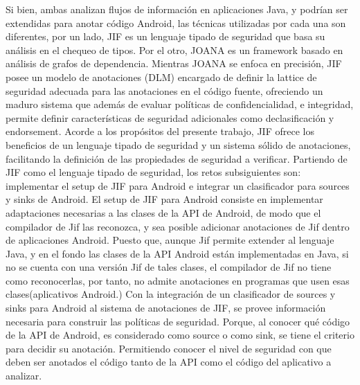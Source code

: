 Si bien, ambas analizan flujos de información en aplicaciones Java, y
podrían ser extendidas para anotar código Android, las técnicas utilizadas por cada una
son diferentes, por un lado, JIF es un lenguaje tipado de seguridad que basa su
análisis en el chequeo de tipos. Por el otro, JOANA es un framework basado en
análisis de grafos de dependencia. Mientras JOANA se enfoca en precisión, JIF
posee un modelo de anotaciones (DLM) encargado de definir la lattice de
seguridad adecuada para las anotaciones en el código fuente, ofreciendo un
maduro sistema que además de evaluar políticas de confidencialidad, e
integridad, permite definir características de seguridad adicionales como
declasificación y endorsement.
Acorde a los propósitos del presente trabajo, JIF ofrece los beneficios de un
lenguaje tipado de seguridad y un sistema  sólido  de anotaciones, facilitando
la definición de las propiedades de seguridad a verificar.\newline 
Partiendo de JIF como el lenguaje tipado de seguridad, los retos subsiguientes
son: implementar el setup de JIF para Android e integrar un clasificador
para sources y sinks de Android. 
El setup de JIF para Android consiste en implementar adaptaciones necesarias
a las clases de la API de Android, de modo que el compilador de Jif las
reconozca, y sea posible adicionar anotaciones de Jif dentro de aplicaciones
Android. Puesto que, aunque Jif permite extender al lenguaje Java, y en el fondo
las clases de la API Android están implementadas en Java, si no se cuenta con
una versión Jif de tales clases, el compilador de Jif no tiene como
reconocerlas, por tanto, no admite anotaciones en programas que usen esas
clases(aplicativos Android.)\newline
Con la integración de un clasificador de sources y sinks para Android al sistema
de anotaciones de JIF, se provee información necesaria para construir las
políticas de seguridad. Porque, al conocer qué código de la API de Android,
es considerado como source o como sink, se tiene el criterio para decidir su
anotación. Permitiendo conocer el nivel de seguridad con que deben ser
anotados el código tanto de la API como el código del aplicativo a
analizar.\newline
